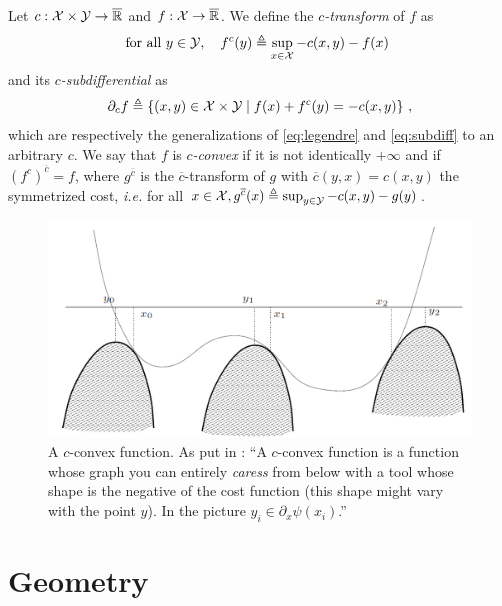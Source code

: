     \begin{defi}[$c$-convexity]
        \label{def:c-convex}
        Let $c:\mathcal{X}\times\mathcal{Y}\to\overline{\mathbb{R}}$ and $f:\mathcal{X}\to\overline{\mathbb{R}}$. We define the $c$\emph{-transform} of $f$ as
        \begin{equation}
            \text{for all }y\in\mathcal{Y},\quad f^{c}(y)\triangleq\sup_{x\in\mathcal{X}} -c(x,y)-f(x)\
        \end{equation}
        and its $c$\emph{-subdifferential} as
        \begin{equation}
            \partial_cf\triangleq\left\{(x,y)\in\mathcal X\times \mathcal Y\mid f(x)+f^c(y)=-c(x,y)\right\}\,,
        \end{equation}
        which are respectively the generalizations of \cref{eq:legendre} and \cref{eq:subdiff} to an arbitrary $c$. We say that $f$ is $c$\emph{-convex} if it is not identically $+\infty$ and if $(f^c)^{\overline{c}}=f$, where $g^{\overline{c}}$ is the $\overline{c}$-transform of $g$ with $\overline{c}(y,x)=c(x,y)$ the symmetrized cost, \textit{i.e.} for all $x\in\mathcal{X}, g^{\overline{c}}(x)\triangleq\sup_{y\in\mathcal{Y}} -c(x,y)-g(y)$.
    \end{defi}

    \begin{figure}[h]
        \centering
        \includegraphics[width=.85\textwidth]{img/c-convex-villani.png}
        \caption[A $c$-convex function.]{A $c$-convex function. As put in \cite{villani2009optimal}: ``A $c$-convex function is a function whose graph you can entirely \emph{caress} from below with a tool whose shape is the negative of the cost function (this shape might vary with the point $y$). In the picture $y_i \in \partial_x\psi(x_i)$.''}
        \label{fig:c-convex}
    \end{figure}


\section{Geometry}

